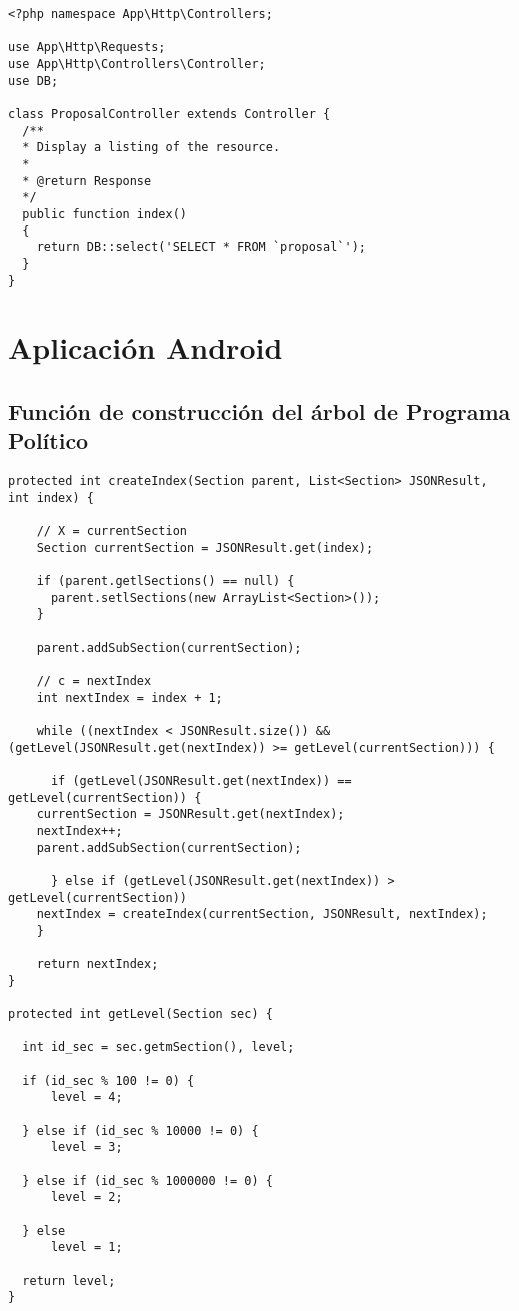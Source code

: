 \lstset{
  language        = php}
\begin{lstlisting}[frame=single]
<?php namespace App\Http\Controllers;

use App\Http\Requests;
use App\Http\Controllers\Controller;
use DB;

class ProposalController extends Controller {
  /**
  * Display a listing of the resource.
  *
  * @return Response
  */
  public function index()
  {
    return DB::select('SELECT * FROM `proposal`');
  }
}
\end{lstlisting}

\section{Aplicación Android}

\subsection{Función de construcción del árbol de Programa Político}\label{ssec:codeProgramTree}

	  \begin{lstlisting}[frame=single]	
protected int createIndex(Section parent, List<Section> JSONResult, int index) {

    // X = currentSection
    Section currentSection = JSONResult.get(index);

    if (parent.getlSections() == null) {
      parent.setlSections(new ArrayList<Section>());
    }
	    
    parent.addSubSection(currentSection);

    // c = nextIndex
    int nextIndex = index + 1;

    while ((nextIndex < JSONResult.size()) && (getLevel(JSONResult.get(nextIndex)) >= getLevel(currentSection))) {
      
      if (getLevel(JSONResult.get(nextIndex)) == getLevel(currentSection)) {
	currentSection = JSONResult.get(nextIndex);
	nextIndex++;
	parent.addSubSection(currentSection);
	
      } else if (getLevel(JSONResult.get(nextIndex)) > getLevel(currentSection))
	nextIndex = createIndex(currentSection, JSONResult, nextIndex);
    }
    
    return nextIndex;
}

protected int getLevel(Section sec) {
  
  int id_sec = sec.getmSection(), level;
  
  if (id_sec % 100 != 0) {
      level = 4;
      
  } else if (id_sec % 10000 != 0) {
      level = 3;
      
  } else if (id_sec % 1000000 != 0) {
      level = 2;
      
  } else
      level = 1;
      
  return level;
}	   
	  \end{lstlisting}
	  


\rhead{}
\renewcommand{\headrulewidth}{0pt}